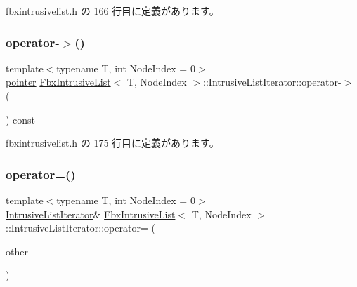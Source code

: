  fbxintrusivelist.\+h の 166 行目に定義があります。

\mbox{\label{class_fbx_intrusive_list_1_1_intrusive_list_iterator_ad699b071c709f496ca56d77c463d6a3a}} 
\subsubsection{\texorpdfstring{operator-\/$>$()}{operator->()}}
{\footnotesize\ttfamily template$<$typename T, int Node\+Index = 0$>$ \\
\hyperlink{class_fbx_intrusive_list_ad04ad10d67ddd0d4104b172839c908d7}{pointer} \hyperlink{class_fbx_intrusive_list}{Fbx\+Intrusive\+List}$<$ T, Node\+Index $>$\+::Intrusive\+List\+Iterator\+::operator-\/$>$ (\begin{DoxyParamCaption}{ }\end{DoxyParamCaption}) const\hspace{0.3cm}{\ttfamily [inline]}}



 fbxintrusivelist.\+h の 175 行目に定義があります。

\mbox{\label{class_fbx_intrusive_list_1_1_intrusive_list_iterator_aea5cf4fe46c0094874ddd5ee8d356903}} 
\subsubsection{\texorpdfstring{operator=()}{operator=()}}
{\footnotesize\ttfamily template$<$typename T, int Node\+Index = 0$>$ \\
\hyperlink{class_fbx_intrusive_list_1_1_intrusive_list_iterator}{Intrusive\+List\+Iterator}\& \hyperlink{class_fbx_intrusive_list}{Fbx\+Intrusive\+List}$<$ T, Node\+Index $>$\+::Intrusive\+List\+Iterator\+::operator= (\begin{DoxyParamCaption}\item[{const \hyperlink{class_fbx_intrusive_list_1_1_intrusive_list_iterator}{Intrusive\+List\+Iterator} \&}]{other }\end{DoxyParamCaption})\hspace{0.3cm}{\ttfamily [inline]}}



